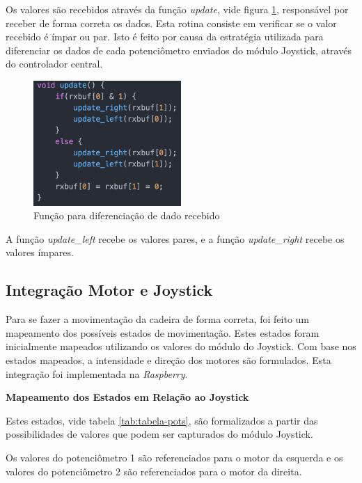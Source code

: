     Os valores são recebidos através da função \textit{update}, vide figura \ref{fig:update}, responsável por receber de forma correta os dados. Esta rotina consiste em verificar se o valor recebido é ímpar ou par. Isto é feito por causa da estratégia utilizada para diferenciar os dados de cada potenciômetro enviados do módulo Joystick, através do controlador central.

    \begin{figure}[!htb]
    \centering
    \includegraphics[width = 0.5\textwidth]{figuras/resultados/update}
    \caption{Função para diferenciação de dado recebido}
    \label{fig:update}
    \end{figure}

    A função \textit{update\_left} recebe os valores pares, e a função \textit{update\_right} recebe os valores ímpares.

\subsection{Integração Motor e Joystick}

Para se fazer a movimentação da cadeira de forma correta, foi feito um mapeamento dos possíveis estados de movimentação. Estes estados foram inicialmente mapeados utilizando os valores do módulo do Joystick. Com base nos estados mapeados, a intensidade e direção dos motores são formulados. Esta integração foi implementada na \textit{Raspberry}.

  \textbf{Mapeamento dos Estados em Relação ao Joystick}

  Estes estados, vide tabela \ref{tab:tabela-pots}, são formalizados a partir das possibilidades de valores que podem ser capturados do módulo Joystick.

  Os valores do potenciômetro 1 são referenciados para o motor da esquerda e os valores do potenciômetro 2 são referenciados para o motor da direita.

